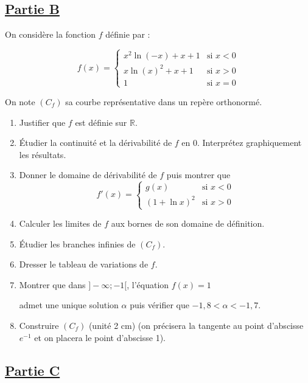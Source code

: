 \documentclass[12pt,a4paper]{article}
\begin{document}
\subsection*{\underline{\textbf{Partie B}}}

On considère la fonction \( f \) définie par :

\[
    f(x) =
    \begin{cases}
        x^2 \ln(-x) + x + 1 & \text{si } x < 0 \\
        x \ln(x)^2 + x + 1  & \text{si } x > 0 \\
        1                   & \text{si } x = 0
    \end{cases}
\]

On note \( (C_f) \) sa courbe représentative dans un repère orthonormé.

\begin{enumerate}
    \item Justifier que \( f \) est définie sur \( \mathbb{R} \).
    \item Étudier la continuité et la dérivabilité de \( f \) en 0. Interprétez graphiquement les résultats.
    \item Donner le domaine de dérivabilité de \( f \) puis montrer que
          \[
              f'(x) =
              \begin{cases}
                  g(x)          & \text{si } x < 0 \\
                  (1 + \ln x)^2 & \text{si } x > 0
              \end{cases}
          \]
    \item Calculer les limites de \( f \) aux bornes de son domaine de définition.
    \item Étudier les branches infinies de \( (C_f) \).
    \item Dresser le tableau de variations de \( f \).
    \item Montrer que dans \( ]-\infty; -1[ \), l’équation \( f(x) = 1 \)

          admet une unique solution \( \alpha \) puis vérifier que \(-1,8 < \alpha < -1,7\).
    \item Construire \( (C_f) \) (unité 2 cm) (on précisera la tangente au point d’abscisse \( e^{-1} \) et on placera le point d’abscisse 1).
\end{enumerate}

\subsection*{\underline{\textbf{Partie C}}}
\end{document}
